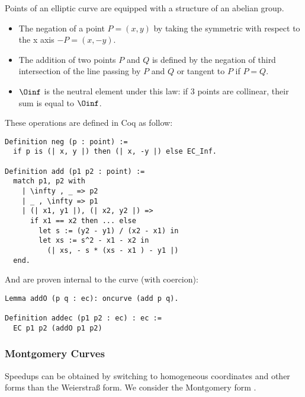 Points of an elliptic curve are equipped with a structure of an abelian group.
\begin{itemize}
  \item The negation of a point $P = (x,y)$ by taking the symmetric with respect to the x axis $-P = (x, -y)$.
  \item The addition of two points $P$ and $Q$ is defined by the negation of third intersection
  of the line passing by $P$ and $Q$ or tangent to $P$ if $P = Q$.
  \item $\Oinf$ is the neutral element under this law: if 3 points are collinear, their sum is equal to $\Oinf$.
\end{itemize}
These operations are defined in Coq as follow:
\begin{lstlisting}[language=Coq]
Definition neg (p : point) :=
  if p is (| x, y |) then (| x, -y |) else EC_Inf.

Definition add (p1 p2 : point) :=
  match p1, p2 with
    | \infty , _ => p2
    | _ , \infty => p1
    | (| x1, y1 |), (| x2, y2 |) =>
      if x1 == x2 then ... else
        let s := (y2 - y1) / (x2 - x1) in
        let xs := s^2 - x1 - x2 in
          (| xs, - s * (xs - x1 ) - y1 |)
  end.
\end{lstlisting}
And are proven internal to the curve (with coercion):
\begin{lstlisting}[language=Coq]
Lemma addO (p q : ec): oncurve (add p q).

Definition addec (p1 p2 : ec) : ec :=
  EC p1 p2 (addO p1 p2)
\end{lstlisting}

\subsubsection{Montgomery Curves}
\label{subsec:ECC-Montgomery}

Speedups can be obtained by switching to homogeneous coordinates and other forms
than the Weierstra{\ss} form. We consider the Montgomery form \cite{MontgomerySpeeding}.

